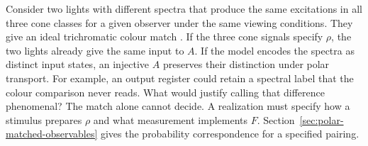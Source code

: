 \documentclass[11pt]{article}
\theoremstyle{definition}
\begin{document}
Consider two lights with different spectra that produce the same excitations in all three cone classes for a given observer under the same viewing conditions. They give an ideal trichromatic colour match \cite{StockmanRider2023}. If the three cone signals specify $\rho$, the two lights already give the same input to $A$. If the model encodes the spectra as distinct input states, an injective $A$ preserves their distinction under polar transport. For example, an output register could retain a spectral label that the colour comparison never reads. What would justify calling that difference phenomenal? The match alone cannot decide. A realization must specify how a stimulus prepares $\rho$ and what measurement implements $F$. Section~\ref{sec:polar-matched-observables} gives the probability correspondence for a specified pairing.
\end{document}

